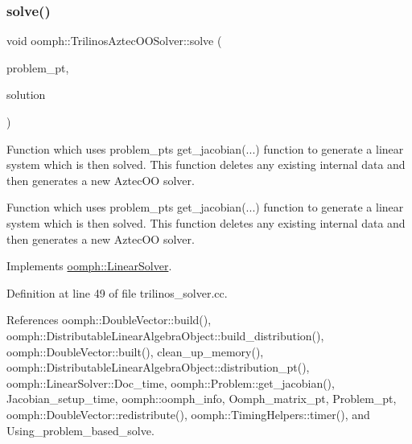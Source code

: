 \mbox{\label{classoomph_1_1TrilinosAztecOOSolver_a7dc1ae7f05e8a50416b8df700f832eb9}} 
\subsubsection{\texorpdfstring{solve()}{solve()}\hspace{0.1cm}{\footnotesize\ttfamily [1/2]}}
{\footnotesize\ttfamily void oomph\+::\+Trilinos\+Aztec\+O\+O\+Solver\+::solve (\begin{DoxyParamCaption}\item[{\hyperlink{classoomph_1_1Problem}{Problem} $\ast$const \&}]{problem\+\_\+pt,  }\item[{\hyperlink{classoomph_1_1DoubleVector}{Double\+Vector} \&}]{solution }\end{DoxyParamCaption})\hspace{0.3cm}{\ttfamily [virtual]}}



Function which uses problem\+\_\+pt\textquotesingle{}s get\+\_\+jacobian(...) function to generate a linear system which is then solved. This function deletes any existing internal data and then generates a new Aztec\+OO solver. 

Function which uses problem\+\_\+pt\textquotesingle{}s get\+\_\+jacobian(...) function to generate a linear system which is then solved. This function deletes any existing internal data and then generates a new Aztec\+OO solver. 

Implements \hyperlink{classoomph_1_1LinearSolver_a15ce22542b74ed1826ea485edacbeb6e}{oomph\+::\+Linear\+Solver}.



Definition at line 49 of file trilinos\+\_\+solver.\+cc.



References oomph\+::\+Double\+Vector\+::build(), oomph\+::\+Distributable\+Linear\+Algebra\+Object\+::build\+\_\+distribution(), oomph\+::\+Double\+Vector\+::built(), clean\+\_\+up\+\_\+memory(), oomph\+::\+Distributable\+Linear\+Algebra\+Object\+::distribution\+\_\+pt(), oomph\+::\+Linear\+Solver\+::\+Doc\+\_\+time, oomph\+::\+Problem\+::get\+\_\+jacobian(), Jacobian\+\_\+setup\+\_\+time, oomph\+::oomph\+\_\+info, Oomph\+\_\+matrix\+\_\+pt, Problem\+\_\+pt, oomph\+::\+Double\+Vector\+::redistribute(), oomph\+::\+Timing\+Helpers\+::timer(), and Using\+\_\+problem\+\_\+based\+\_\+solve.

